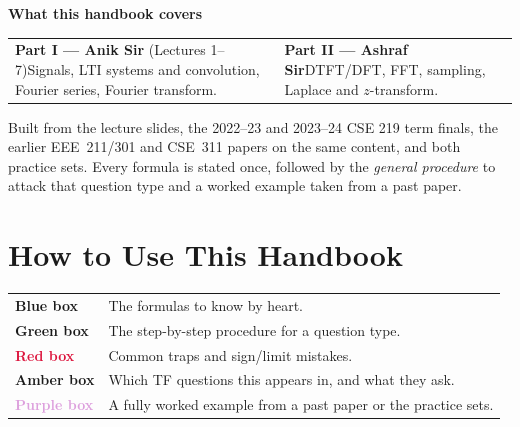 \documentclass[11pt,a4paper,openany]{book}
\begin{document}
\frontmatter
\begin{titlepage}
\vspace*{10.2cm}

{\large\color{navy}\bfseries What this handbook covers}\par\smallskip
\begin{tabular}{@{}p{}p{}@{}}
\textbf{Part I --- Anik Sir} (Lectures 1--7)\newline Signals, LTI systems and convolution, Fourier series, Fourier transform. &
\textbf{Part II --- Ashraf Sir}\newline DTFT/DFT, FFT, sampling, Laplace and $z$-transform.\\
\end{tabular}
\vfill
\begin{tcolorbox}[colback=paper,colframe=navy!40]
\small Built from the lecture slides, the 2022--23 and 2023--24 CSE 219 term finals, the earlier EEE~211/301 and CSE~311 papers on the same content, and both practice sets. Every formula is stated once, followed by the \emph{general procedure} to attack that question type and a worked example taken from a past paper.
\end{tcolorbox}
\end{titlepage}

\chapter*{How to Use This Handbook}
\begin{tabularx}{\textwidth}{@{}>{\bfseries}p{2.6cm}X@{}}
\textcolor{sky}{Blue box} & The formulas to know by heart.\\
\textcolor{forest}{Green box} & The step-by-step procedure for a question type.\\
\textcolor{crimson}{Red box} & Common traps and sign/limit mistakes.\\
\textcolor{amber}{Amber box} & Which TF questions this appears in, and what they ask.\\
\textcolor{plum}{Purple box} & A fully worked example from a past paper or the practice sets.\\
\end{tabularx}
\end{document}
